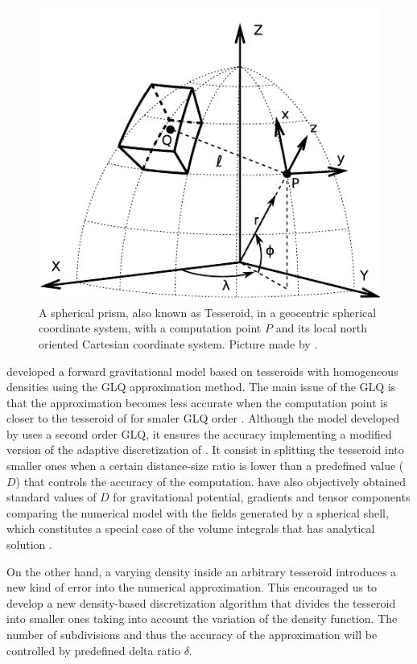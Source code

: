 \documentclass[extra]{gji}
\begin{document}
\begin{figure}
\centering
\includegraphics[width=0.9\linewidth]{figures/tesseroid-uieda.pdf}
\caption{
    A spherical prism, also known as  Tesseroid, in a geocentric spherical 
    coordinate system, with a computation point $P$ and its local north 
    oriented Cartesian coordinate system. Picture made by \citet{Uieda2015}.
}
\label{fig:tesseroid-uieda}
\end{figure}

\citet{Uieda2016} developed a forward gravitational model based on 
tesseroids with homogeneous densities using the GLQ approximation 
method.
The main issue of the GLQ is that the approximation becomes less 
accurate when the computation point is closer to the tesseroid of for 
smaler GLQ order \citep{Ku1977}.
Although the model developed by \citet{Uieda2016} uses a second order GLQ, it 
ensures the accuracy implementing a modified version of the adaptive 
discretization of \citet{Li2011}.
It consist in splitting the tesseroid into smaller ones when a certain 
distance-size ratio is lower than a predefined value ($D$) that controls the 
accuracy of the computation.
\citet{Uieda2016} have also objectively obtained standard values of $D$ 
for gravitational potential, gradients and tensor components comparing 
the numerical model with the fields generated by a spherical shell, 
which constitutes a special case of the volume integrals that has 
analytical solution \citep{LaFehr1991, Mikuska2006, Grombein2013} 
.

On the other hand, a varying density inside an arbitrary tesseroid 
introduces a new kind of error into the numerical approximation.
This encouraged us to develop a new density-based discretization 
algorithm that divides the tesseroid into smaller ones taking into 
account the variation of the density function.
The number of subdivisions and thus the accuracy of the approximation 
will be controlled by predefined delta ratio $\delta$.
\end{document}
